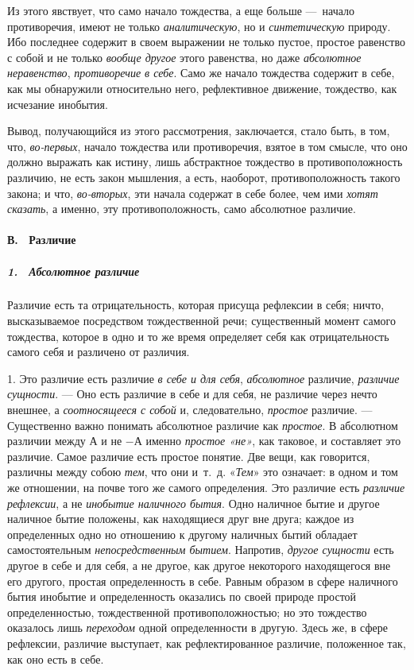 Из этого явствует, что само начало тождества, а еще больше —~начало
противоречия, имеют не только {\em аналитическую}, но и
{\em синтетическую} природу. Ибо последнее содержит в
своем выражении не только пустое, простое равенство с собой и не только
{\em вообще другое} этого равенства, но даже
{\em абсолютное неравенство},
{\em противоречие в себе}. Само же начало тождества
содержит в себе, как мы обнаружили относительно него, рефлективное
движение, тождество, как исчезание инобытия.

Вывод, получающийся из этого рассмотрения, заключается, стало быть, в том,
что, {\em во-первых}, начало тождества или
противоречия, взятое в том смысле, что оно должно выражать как истину, лишь
абстрактное тождество в противоположность различию, не есть закон мышления,
а есть, наоборот, противоположность такого закона; и что,
{\em во-вторых}, эти начала содержат в себе более, чем
ими {\em хотят сказать}, а именно, эту
противоположность, само абсолютное различие.

\paragraph[В. \ Различие]{В. \ Различие}
\subparagraph[1. \ Абсолютное различие]{1. \ Абсолютное различие}
Различие есть та отрицательность, которая
присуща рефлексии в себя; ничто, высказываемое посредством тождественной
речи; существенный момент самого тождества, которое в одно и то же время
определяет себя как отрицательность самого себя и различено от различия.

1. Это различие есть различие {\em в себе и для себя},
{\em абсолютное} различие,
{\em различие сущности}. — Оно есть различие в себе и
для себя, не различие через нечто внешнее, а
{\em соотносящееся с собой} и, следовательно,
{\em простое }различие. — Существенно важно понимать
абсолютное различие как {\em простое}. В абсолютном
различии между $А$ и не $-А$ именно
{\em простое «не»}, как таковое, и составляет это
различие. Самое различие есть простое понятие. Две вещи, как говорится,
различны между собою {\em тем}, что они и~т.~д.
«{\em Тем}» это означает: в одном и том же отношении,
на почве того же самого определения. Это различие есть
{\em различие рефлексии}, а не
{\em инобытие наличного бытия}. Одно наличное бытие и
другое наличное бытие положены, как находящиеся друг вне друга; каждое из
определенных одно но отношению к другому наличных бытий обладает
самостоятельным {\em непосредственным бытием}.
Напротив, {\em другое сущности} есть другое в себе и
для себя, а не другое, как другое некоторого находящегося вне его другого,
простая определенность в себе. Равным образом в сфере наличного бытия
инобытие и определенность оказались по своей природе простой
определенностью, тождественной противоположностью; но это тождество
оказалось лишь {\em переходом} одной определенности в
другую. Здесь же, в сфере рефлексии, различие выступает, как
рефлектированное различие, положенное так, как оно есть в себе.

